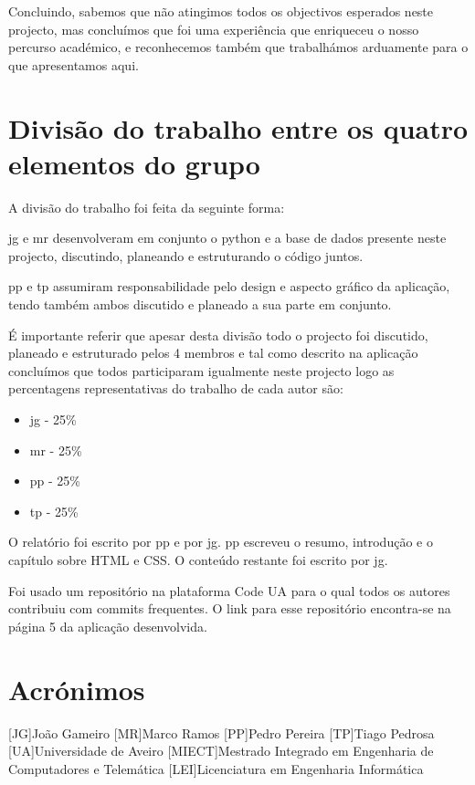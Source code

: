 \documentclass{report}
\begin{document}
 Concluindo, sabemos que não atingimos todos os objectivos esperados neste projecto, mas concluímos que foi uma experiência que enriqueceu o nosso percurso académico, e reconhecemos também que trabalhámos arduamente para o que apresentamos aqui. 




\chapter{Divisão do trabalho entre os quatro elementos do grupo}
\label{chap.div}

A divisão do trabalho foi feita da seguinte forma:

\ac{jg} e \ac{mr} desenvolveram em conjunto o python e a base de dados presente neste projecto, discutindo, planeando e estruturando o código juntos.

\ac{pp} e \ac{tp} assumiram responsabilidade pelo design e aspecto gráfico da aplicação, tendo também ambos discutido e planeado a sua parte em conjunto.

É importante referir que apesar desta divisão todo o projecto foi discutido, planeado e estruturado pelos 4 membros e tal como descrito na aplicação concluímos que todos participaram igualmente neste projecto logo as percentagens representativas do trabalho de cada autor são:
 \begin{itemize}
     \item \ac{jg} - 25\%
     \item \ac{mr} - 25\%
     \item \ac{pp} - 25\%
     \item \ac{tp} - 25\%
 \end{itemize}
 
 O relatório foi escrito por \ac{pp} e por \ac{jg}.
 \ac{pp} escreveu o resumo, introdução e o capítulo sobre HTML e CSS. O conteúdo restante foi escrito por \ac{jg}.
 
 Foi usado um repositório na plataforma Code UA para o qual todos os autores contribuiu com commits frequentes. O link para esse repositório encontra-se na página 5 da aplicação desenvolvida.



\chapter*{Acrónimos}
\begin{acronym}
[JG]{João Gameiro}
[MR]{Marco Ramos}
[PP]{Pedro Pereira}
[TP]{Tiago Pedrosa}
[UA]{Universidade de Aveiro}
[MIECT]{Mestrado Integrado em Engenharia de Computadores e Telemática}
[LEI]{Licenciatura em Engenharia Informática}

\end{acronym}


\printbibliography
\end{document}
